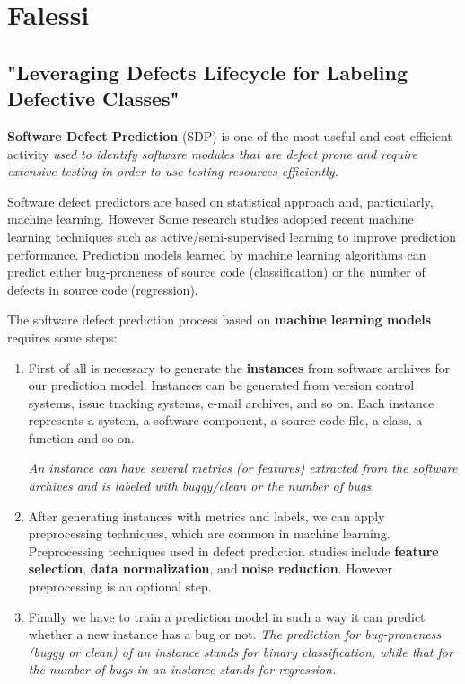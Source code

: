 \documentclass[10pt,a4paper]{article}
\begin{document}
\section{Falessi}

\subsection{"Leveraging Defects Lifecycle for Labeling Defective Classes"}

\textbf{Software Defect Prediction} (SDP) is one of the most useful and cost efficient activity \textit{used to identify software modules that are defect prone and require extensive testing in order to use testing resources efficiently.} 

Software defect predictors are based on statistical approach and, particularly, machine learning. However Some research studies adopted recent machine learning techniques such as active/semi-supervised learning to improve prediction performance. Prediction models learned by machine learning algorithms can predict either bug-proneness of source code (classification) or the number of defects in source code (regression).

The software defect prediction process based on \textbf{machine learning models} requires some steps:

\begin{enumerate}

\item First of all is necessary to generate the \textbf{instances} from software archives for our prediction model. Instances can be generated from version control systems, issue tracking systems, e-mail archives, and so on. Each instance represents a system, a software component, a source code file, a class, a function and so on.

\textit{An instance can have several metrics (or features) extracted from the software archives and is labeled with buggy/clean or the number of bugs.}

\item After generating instances with metrics and labels, we can apply preprocessing techniques, which are common in machine learning. Preprocessing techniques used in defect prediction studies include \textbf{feature selection}, \textbf{data normalization}, and \textbf{noise reduction}. However preprocessing is an optional step.  

\item Finally we have to train a prediction model in such a way it can predict whether a new instance has a bug or not. \textit{The prediction for bug-proneness (buggy or clean) of an instance stands for binary classification, while that for the number of bugs in an instance stands for regression.}

\end{enumerate}
\end{document}
